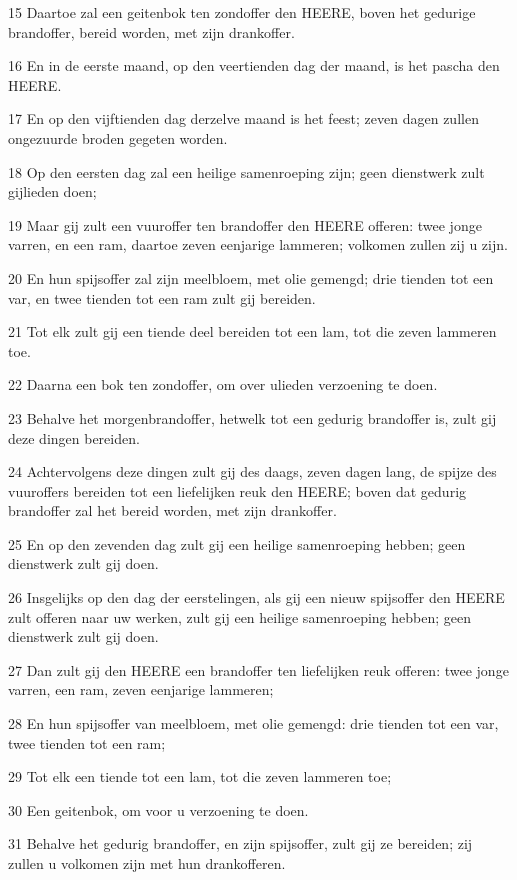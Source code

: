 \par 15 Daartoe zal een geitenbok ten zondoffer den HEERE, boven het gedurige brandoffer, bereid worden, met zijn drankoffer.
\par 16 En in de eerste maand, op den veertienden dag der maand, is het pascha den HEERE.
\par 17 En op den vijftienden dag derzelve maand is het feest; zeven dagen zullen ongezuurde broden gegeten worden.
\par 18 Op den eersten dag zal een heilige samenroeping zijn; geen dienstwerk zult gijlieden doen;
\par 19 Maar gij zult een vuuroffer ten brandoffer den HEERE offeren: twee jonge varren, en een ram, daartoe zeven eenjarige lammeren; volkomen zullen zij u zijn.
\par 20 En hun spijsoffer zal zijn meelbloem, met olie gemengd; drie tienden tot een var, en twee tienden tot een ram zult gij bereiden.
\par 21 Tot elk zult gij een tiende deel bereiden tot een lam, tot die zeven lammeren toe.
\par 22 Daarna een bok ten zondoffer, om over ulieden verzoening te doen.
\par 23 Behalve het morgenbrandoffer, hetwelk tot een gedurig brandoffer is, zult gij deze dingen bereiden.
\par 24 Achtervolgens deze dingen zult gij des daags, zeven dagen lang, de spijze des vuuroffers bereiden tot een liefelijken reuk den HEERE; boven dat gedurig brandoffer zal het bereid worden, met zijn drankoffer.
\par 25 En op den zevenden dag zult gij een heilige samenroeping hebben; geen dienstwerk zult gij doen.
\par 26 Insgelijks op den dag der eerstelingen, als gij een nieuw spijsoffer den HEERE zult offeren naar uw werken, zult gij een heilige samenroeping hebben; geen dienstwerk zult gij doen.
\par 27 Dan zult gij den HEERE een brandoffer ten liefelijken reuk offeren: twee jonge varren, een ram, zeven eenjarige lammeren;
\par 28 En hun spijsoffer van meelbloem, met olie gemengd: drie tienden tot een var, twee tienden tot een ram;
\par 29 Tot elk een tiende tot een lam, tot die zeven lammeren toe;
\par 30 Een geitenbok, om voor u verzoening te doen.
\par 31 Behalve het gedurig brandoffer, en zijn spijsoffer, zult gij ze bereiden; zij zullen u volkomen zijn met hun drankofferen.

